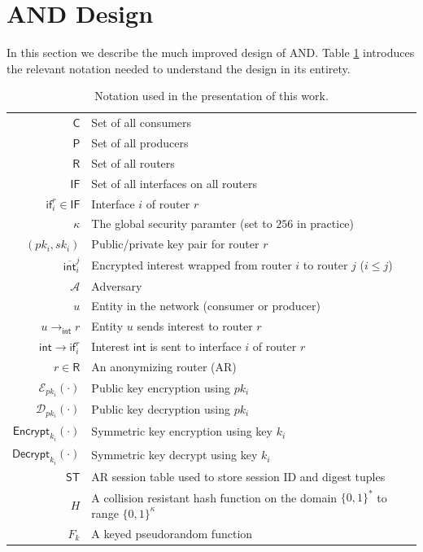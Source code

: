 \section{AND Design} \label{sec:design}
In this section we describe the much improved design of {\sf AND}. Table \ref{tab:notation} introduces the relevant notation needed to understand the design in its entirety. 

\begin{table}
\centering
\caption{Notation used in the presentation of this work.}
\label{tab:notation}
  \begin{tabular}{| r | l |} \hline
  $\mathsf{C}$ & Set of all consumers  \\
  $\mathsf{P}$ & Set of all producers  \\ 
  $\mathsf{R}$ & Set of all routers  \\
  $\mathsf{IF}$ & Set of all interfaces on all routers  \\
  $\mathsf{if}_i^r \in \mathsf{IF}$ & Interface $i$ of router $r$  \\
  $\kappa$ & The global security paramter (set to $256$ in practice) \\ 
  $(pk_i, sk_i)$ & Public/private key pair for router $r$  \\
  $\overline{\mathsf{int}}_{i}^{j}$ & Encrypted interest wrapped from router $i$ to router $j$ ($i \leq j$)  \\
  $\mathcal{A}$ & Adversary \\ 
  $u$ & Entity in the network (consumer or producer) \\
  $u \to_{\mathsf{int}} r$ & Entity $u$ sends interest to router $r$  \\ 
  $\mathsf{int} \to \mathsf{if}_i^r$ & Interest $\mathsf{int}$ is sent to interface $i$ of router $r$ \\
  $r \in \mathsf{R}$ & An anonymizing router (AR) \\ 
  $\mathcal{E}_{pk_i}(\cdot)$ & Public key encryption using $pk_i$ \\ 
  $\mathcal{D}_{pk_i}(\cdot)$ & Public key decryption using $pk_i$ \\ 
  $\mathsf{Encrypt}_{k_i}(\cdot)$ & Symmetric key encryption using key $k_i$ \\ 
  $\mathsf{Decrypt}_{k_i}(\cdot)$ & Symmetric key decrypt using key $k_i$ \\ 
  $\mathsf{ST}$ & AR session table used to store session ID and digest tuples \\
  $H$ & A collision resistant hash function on the domain $\{0,1\}^*$ to range $\{0,1\}^{\kappa}$ \\
  $F_k$ & A keyed pseudorandom function \\ \hline
  \end{tabular}
\end{table}


